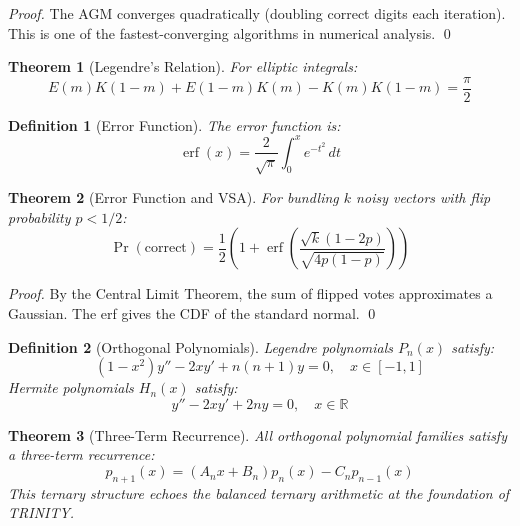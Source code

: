 \documentclass[aps,prd,preprint,superscriptaddress,showpacs,nofootinbib,longbibliography]{revtex4-2}
\newtheorem{theorem}{Theorem}
\newtheorem{definition}{Definition}
\begin{document}
\begin{proof}
The AGM converges quadratically (doubling correct digits each iteration). This is one of the fastest-converging algorithms in numerical analysis. \qed
\end{proof}

\begin{theorem}[Legendre's Relation]
\label{thm:legendre_rel}
For elliptic integrals:
\begin{equation}
E(m) K(1-m) + E(1-m) K(m) - K(m) K(1-m) = \frac{\pi}{2}
\end{equation}
\end{theorem}

\begin{definition}[Error Function]
\label{def:erf}
The error function is:
\begin{equation}
\operatorname{erf}(x) = \frac{2}{\sqrt{\pi}} \int_0^x e^{-t^2} \, dt
\end{equation}
\end{definition}

\begin{theorem}[Error Function and VSA]
\label{thm:erf_vsa}
For bundling $k$ noisy vectors with flip probability $p < 1/2$:
\begin{equation}
\Pr(\text{correct}) = \frac{1}{2}\left(1 + \operatorname{erf}\left(\frac{\sqrt{k}(1-2p)}{\sqrt{4p(1-p)}}\right)\right)
\end{equation}
\end{theorem}

\begin{proof}
By the Central Limit Theorem, the sum of flipped votes approximates a Gaussian. The erf gives the CDF of the standard normal. \qed
\end{proof}

\begin{definition}[Orthogonal Polynomials]
\label{def:ortho_poly}
Legendre polynomials $P_n(x)$ satisfy:
\begin{equation}
(1-x^2) y'' - 2x y' + n(n+1) y = 0, \quad x \in [-1, 1]
\end{equation}
Hermite polynomials $H_n(x)$ satisfy:
\begin{equation}
y'' - 2x y' + 2n y = 0, \quad x \in \mathbb{R}
\end{equation}
\end{definition}

\begin{theorem}[Three-Term Recurrence]
\label{thm:three_term}
All orthogonal polynomial families satisfy a three-term recurrence:
\begin{equation}
p_{n+1}(x) = (A_n x + B_n) p_n(x) - C_n p_{n-1}(x)
\end{equation}
This ternary structure echoes the balanced ternary arithmetic at the foundation of TRINITY.
\end{theorem}
\end{document}

